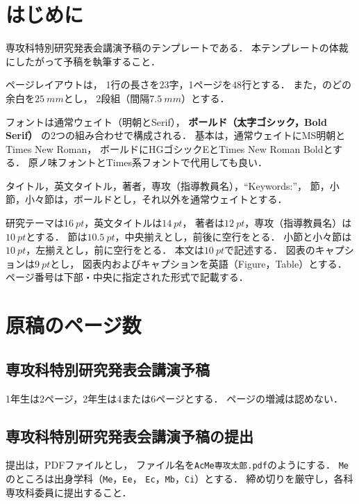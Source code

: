 \documentclass[fonts=default, dvipdfmx]{ac-outline}
\begin{document}
\maketitle

\section{はじめに}

専攻科特別研究発表会講演予稿のテンプレートである．
本テンプレートの体裁にしたがって予稿を執筆すること．

ページレイアウトは，
1行の長さを$23$字，1ページを$48$行とする．
また，のどの余白を$\SI{25}{mm}$とし，
2段組（間隔$\SI{7.5}{mm}$）とする．

フォントは通常ウェイト（明朝とSerif），
\textbf{ボールド（太字ゴシック，Bold Serif）}
の2つの組み合わせで構成される．
基本は，通常ウェイトにMS明朝とTimes New Roman，
ボールドにHGゴシックEとTimes New Roman Boldとする．
原ノ味フォントとTimes系フォントで代用しても良い．

タイトル，英文タイトル，著者，専攻（指導教員名），``Keywords:''，
節，小節，小々節は，ボールドとし，それ以外を通常ウェイトとする．

研究テーマは$\SI{16}{pt}$，英文タイトルは$\SI{14}{pt}$，
著者は$\SI{12}{pt}$，専攻（指導教員名）は$\SI{10}{pt}$とする．
節は$\SI{10.5}{pt}$，中央揃えとし，前後に空行をとる．
小節と小々節は$\SI{10}{pt}$，左揃えとし，前に空行をとる．
本文は$\SI{10}{pt}$で記述する．
図表のキャプションは$\SI{9}{pt}$とし，
図表内およびキャプションを英語（Figure，Table）とする．
ページ番号は下部・中央に指定された形式で記載する．

\section{原稿のページ数}

\subsection{専攻科特別研究発表会講演予稿}

1年生は2ページ，2年生は4または6ページとする．
ページの増減は認めない．

\subsection{専攻科特別研究発表会講演予稿の提出}

提出は，PDFファイルとし，
ファイル名を\texttt{AcMe\mbox{}専攻太郎.pdf}のようにする．
\texttt{Me}のところは出身学科（\texttt{Me}，\texttt{Ee}，
\texttt{Ec}，\texttt{Mb}，\texttt{Ci}）とする．
締め切りを厳守し，各科専攻科委員に提出すること．
\end{document}
